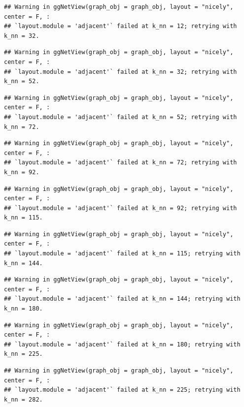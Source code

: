 \documentclass[
]{book}
\begin{document}
\begin{verbatim}
## Warning in ggNetView(graph_obj = graph_obj, layout = "nicely", center = F, :
## `layout.module = 'adjacent'` failed at k_nn = 12; retrying with k_nn = 32.
\end{verbatim}

\begin{verbatim}
## Warning in ggNetView(graph_obj = graph_obj, layout = "nicely", center = F, :
## `layout.module = 'adjacent'` failed at k_nn = 32; retrying with k_nn = 52.
\end{verbatim}

\begin{verbatim}
## Warning in ggNetView(graph_obj = graph_obj, layout = "nicely", center = F, :
## `layout.module = 'adjacent'` failed at k_nn = 52; retrying with k_nn = 72.
\end{verbatim}

\begin{verbatim}
## Warning in ggNetView(graph_obj = graph_obj, layout = "nicely", center = F, :
## `layout.module = 'adjacent'` failed at k_nn = 72; retrying with k_nn = 92.
\end{verbatim}

\begin{verbatim}
## Warning in ggNetView(graph_obj = graph_obj, layout = "nicely", center = F, :
## `layout.module = 'adjacent'` failed at k_nn = 92; retrying with k_nn = 115.
\end{verbatim}

\begin{verbatim}
## Warning in ggNetView(graph_obj = graph_obj, layout = "nicely", center = F, :
## `layout.module = 'adjacent'` failed at k_nn = 115; retrying with k_nn = 144.
\end{verbatim}

\begin{verbatim}
## Warning in ggNetView(graph_obj = graph_obj, layout = "nicely", center = F, :
## `layout.module = 'adjacent'` failed at k_nn = 144; retrying with k_nn = 180.
\end{verbatim}

\begin{verbatim}
## Warning in ggNetView(graph_obj = graph_obj, layout = "nicely", center = F, :
## `layout.module = 'adjacent'` failed at k_nn = 180; retrying with k_nn = 225.
\end{verbatim}

\begin{verbatim}
## Warning in ggNetView(graph_obj = graph_obj, layout = "nicely", center = F, :
## `layout.module = 'adjacent'` failed at k_nn = 225; retrying with k_nn = 282.
\end{verbatim}
\end{document}
